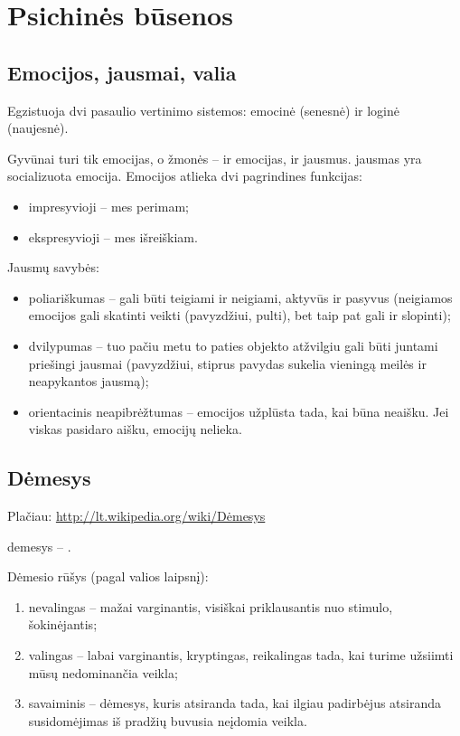 \chapter{Psichinės būsenos}

\label{tema:psichines_busenos}

\section{Emocijos, jausmai, valia}

Egzistuoja dvi pasaulio vertinimo sistemos: emocinė (senesnė) ir loginė 
(naujesnė). 

Gyvūnai turi tik emocijas, o žmonės – ir emocijas, ir jausmus. \Gls{jausmas} 
yra socializuota \gls{emocija}. Emocijos atlieka dvi pagrindines funkcijas:

\begin{itemize}
  \item impresyvioji – mes perimam;
  \item ekspresyvioji – mes išreiškiam.
\end{itemize}

Jausmų savybės:

\begin{itemize}
  \item poliariškumas – gali būti teigiami ir neigiami, aktyvūs ir pasyvus
    (neigiamos emocijos gali skatinti veikti (pavyzdžiui, pulti), bet taip 
    pat gali ir slopinti);
  \item dvilypumas – tuo pačiu metu to paties objekto atžvilgiu gali būti
    juntami priešingi jausmai (pavyzdžiui, stiprus pavydas sukelia 
    vieningą meilės ir neapykantos jausmą);
  \item orientacinis neapibrėžtumas – emocijos užplūsta tada, kai būna
    neaišku. Jei viskas pasidaro aišku, emocijų nelieka.
\end{itemize}

\section{Dėmesys}

\label{tema:demesys}

Plačiau: \url{http://lt.wikipedia.org/wiki/Dėmesys}

\Gls{demesys} – .

Dėmesio rūšys (pagal valios laipsnį):

\begin{enumerate}
  \item nevalingas – mažai varginantis, visiškai priklausantis nuo stimulo, 
    šokinėjantis;
  \item valingas – labai varginantis, kryptingas, reikalingas tada, kai 
    turime užsiimti mūsų nedominančia veikla;
  \item savaiminis – dėmesys, kuris atsiranda tada, kai ilgiau padirbėjus
    atsiranda susidomėjimas iš pradžių buvusia neįdomia veikla.
\end{enumerate}

